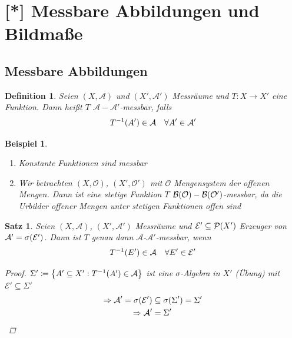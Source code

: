 \documentclass[11pt, twoside, a4paper]{article}
\theoremstyle{plain}
\newtheorem{definition}[blockelement]{Definition}
\newtheorem{satz}[blockelement]{Satz}
\newtheorem{beispiel}[blockelement]{Beispiel}
\numberwithin{equation}{subsection}
\newcommand{\set}[1]{\left\{#1\right\}}
\newcommand{\pair}[1]{\left(#1\right)}
\newcommand{\of}[1]{\mathopen{}\mathclose{}\bgroup\left(#1\aftergroup\egroup\right)}
\newcommand{\impl}[0]{\Rightarrow{}}
\newcommand{\theoremescape}{\leavevmode}
\newcommand{\mA}{\mathcal{A}}
\newcommand{\mB}{\mathcal{B}}
\newcommand{\mE}{\mathcal{E}}
\newcommand{\mO}{\mathcal{O}}
\newcommand{\mP}{\mathcal{P}}
\begin{document}
    \newpage


    \section{[*] Messbare Abbildungen und Bildmaße}

    \subsection{Messbare Abbildungen}
    \thispagestyle{pagenumberonly}

    \begin{definition}
        Seien $\pair{X, \mA}$ und $\pair{X', \mA'}$ Messräume und $T: X\to X'$ eine Funktion. Dann heißt $T$ $\mA-\mA'$-messbar, falls
        \begin{align*}
            T^{-1}\of{A'} \in \mA\quad\forall A'\in\mA'
        \end{align*}
    \end{definition}

    \begin{beispiel}
        \theoremescape
        \begin{enumerate}
            \item Konstante Funktionen sind messbar
            \item Wir betrachten $\pair{X, \mO}$, $\pair{X', \mO'}$ mit $\mO$ Mengensystem der offenen Mengen. Dann ist eine stetige Funktion $T$ $\mB\of{\mO} - \mB\of{\mO'}$-messbar, da die Urbilder offener Mengen unter stetigen Funktionen offen sind
        \end{enumerate}
    \end{beispiel}

    \begin{satz}
        Seien $\pair{X, \mA}$, $\pair{X', \mA'}$ Messräume und $\mE' \subseteq \mP\of{X'}$ Erzeuger von $\mA' = \sigma\of{\mE'}$. Dann ist $T$ genau dann $\mA$-$\mA'$-messbar, wenn
        \begin{align*}
            T^{-1}\of{E'} \in \mA\quad\forall E'\in\mE'
        \end{align*}
        \begin{proof}
            $\Sigma' \coloneqq \set{A' \subseteq X': T^{-1}\of{A'} \in \mA}$ ist eine $\sigma$-Algebra in $X'$ (Übung) mit $\mE' \subseteq \Sigma'$
            \begin{align*}
                \impl \mA' = \sigma\of{\mE'} &\subseteq \sigma\of{\Sigma'} = \Sigma'\\
                \impl \mA' &= \Sigma'\qedhere
            \end{align*}
        \end{proof}
    \end{satz}
\end{document}
